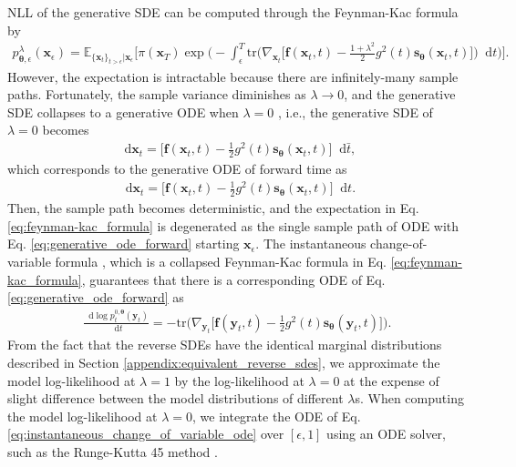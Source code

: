 \documentclass{article}
\theoremstyle{definition}
\theoremstyle{remark}
\newcommand*\diff{\mathop{}\!\mathrm{d}}
\begin{document}
	NLL of the generative SDE can be computed through the Feynman-Kac formula \cite{huang2021variational} by
	\begin{align}\label{eq:feynman-kac_formula}
	p_{\bm{\theta},\epsilon}^{\lambda}(\mathbf{x}_{\epsilon})=\mathbb{E}_{\{\mathbf{x}_{t}\}_{t>\epsilon}\vert\mathbf{x}_{\epsilon}}\bigg[\pi(\mathbf{x}_{T})\exp{\bigg(-\int_{\epsilon}^{T} \text{tr}\Big( \nabla_{\mathbf{x}_{t}}\Big[\mathbf{f}(\mathbf{x}_{t},t) - \frac{1+\lambda^{2}}{2}g^{2}(t)\mathbf{s}_{\bm{\theta}}(\mathbf{x}_{t},t)\Big] \Big) \diff t\bigg)}\bigg].
	\end{align}
	However, the expectation is intractable because there are infinitely-many sample paths. Fortunately, the sample variance diminishes as $\lambda\rightarrow 0$, and the generative SDE collapses to a generative ODE when $\lambda=0$ \cite{song2020score}, i.e., the generative SDE of $\lambda=0$ becomes
	\begin{align*}
	\diff\mathbf{x}_{t}=\bigg[\mathbf{f}(\mathbf{x}_{t},t)-\frac{1}{2}g^{2}(t)\mathbf{s}_{\bm{\theta}}(\mathbf{x}_{t},t)\bigg]\diff \bar{t},
	\end{align*}
	which corresponds to the generative ODE of forward time as
	\begin{align}\label{eq:generative_ode_forward}
	\diff\mathbf{x}_{t}=\bigg[\mathbf{f}(\mathbf{x}_{t},t)-\frac{1}{2}g^{2}(t)\mathbf{s}_{\bm{\theta}}(\mathbf{x}_{t},t)\bigg]\diff t.
	\end{align}
	Then, the sample path becomes deterministic, and the expectation in Eq. \eqref{eq:feynman-kac_formula} is degenerated as the single sample path of ODE with Eq. \eqref{eq:generative_ode_forward} starting $\mathbf{x}_{\epsilon}$. The instantaneous change-of-variable formula \cite{song2020score}, which is a collapsed Feynman-Kac formula in Eq. \eqref{eq:feynman-kac_formula}, guarantees that there is a corresponding ODE of Eq. \eqref{eq:generative_ode_forward} as
	\begin{align}\label{eq:instantaneous_change_of_variable_ode}
	\frac{\diff \log{p_{t}^{0,\bm{\theta}}(\mathbf{y}_{t})}}{\diff t}=-\text{tr}\bigg(\nabla_{\mathbf{y}_{t}}\Big[\mathbf{f}(\mathbf{y}_{t},t)-\frac{1}{2}g^{2}(t)\mathbf{s}_{\bm{\theta}}(\mathbf{y}_{t},t)\Big]\bigg).
	\end{align}
	From the fact that the reverse SDEs have the identical marginal distributions described in Section \ref{appendix:equivalent_reverse_sdes}, we approximate the model log-likelihood at $\lambda=1$ by the log-likelihood at $\lambda=0$ at the expense of slight difference between the model distributions of different $\lambda$s. When computing the model log-likelihood at $\lambda=0$, we integrate the ODE of Eq. \eqref{eq:instantaneous_change_of_variable_ode} over $[\epsilon,1]$ using an ODE solver, such as the Runge-Kutta 45 method \cite{dormand1980family}.
	
\end{document}
